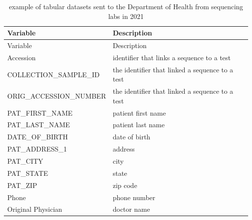 \documentclass[
]{agujournal2019}
\begin{document}
\begin{longtable}[]{@{}
  >{\raggedright\arraybackslash}p{}
  >{\raggedright\arraybackslash}p{}@{}}
\caption{example of tabular datasets sent to the Department of Health
from sequencing labs in 2021}\label{tbl-tabdata1}\tabularnewline
\toprule\noalign{}
\begin{minipage}[b]{\linewidth}\raggedright
Variable
\end{minipage} & \begin{minipage}[b]{\linewidth}\raggedright
Description
\end{minipage} \\
\midrule\noalign{}
\endfirsthead
\toprule\noalign{}
\begin{minipage}[b]{\linewidth}\raggedright
Variable
\end{minipage} & \begin{minipage}[b]{\linewidth}\raggedright
Description
\end{minipage} \\
\midrule\noalign{}
\endhead
\bottomrule\noalign{}
\endlastfoot
Accession & identifier that links a sequence to a test \\
COLLECTION\_SAMPLE\_ID & the identifier that linked a sequence to a
test \\
ORIG\_ACCESSION\_NUMBER & the identifier that linked a sequence to a
test \\
PAT\_FIRST\_NAME & patient first name \\
PAT\_LAST\_NAME & patient last name \\
DATE\_OF\_BIRTH & date of birth \\
PAT\_ADDRESS\_1 & address \\
PAT\_CITY & city \\
PAT\_STATE & state \\
PAT\_ZIP & zip code \\
Phone & phone number \\
Original Physician & doctor name \\
\end{longtable}
\end{document}
